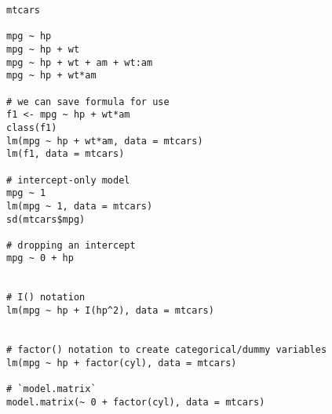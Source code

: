 \documentclass[a4paper,12pt]{article}
\begin{document}
\begin{lstlisting}
mtcars

mpg ~ hp
mpg ~ hp + wt
mpg ~ hp + wt + am + wt:am
mpg ~ hp + wt*am

# we can save formula for use
f1 <- mpg ~ hp + wt*am
class(f1)
lm(mpg ~ hp + wt*am, data = mtcars)
lm(f1, data = mtcars)

# intercept-only model
mpg ~ 1
lm(mpg ~ 1, data = mtcars)
sd(mtcars$mpg)

# dropping an intercept
mpg ~ 0 + hp


# I() notation
lm(mpg ~ hp + I(hp^2), data = mtcars)


# factor() notation to create categorical/dummy variables
lm(mpg ~ hp + factor(cyl), data = mtcars)

# `model.matrix`
model.matrix(~ 0 + factor(cyl), data = mtcars)

\end{lstlisting}
\end{document}
